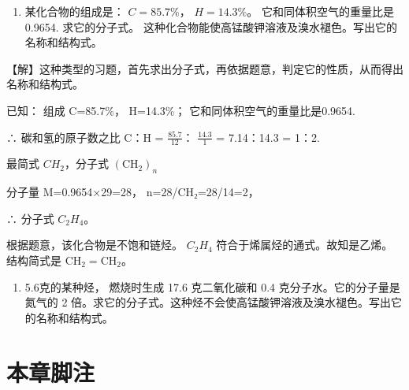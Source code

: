 \begin{enumerate}[start=9]
\item
  某化合物的组成是： \(C = 85.7\%\)， \(H = 14.3\%\)。
  它和同体积空气的重量比是 0.9654. 求它的分子式。
  这种化合物能使高锰酸钾溶液及溴水褪色。写出它的名称和结构式。
\end{enumerate}

【解】这种类型的习题，首先求出分子式，再依据题意，判定它的性质，从而得出名称和结构式。

已知： 组成 C=85.7\%， H=14.3\%； 它和同体积空气的重量比是0.9654.

∴ 碳和氢的原子数之比 C：H = \(\frac{85.7}{12}\)： \(\frac{14.3}{1}\) =
7.14：14.3 = 1：2.

最简式 \(CH_{2}\)，分子式 \((\mathrm{CH}_{2})_{n}\)

分子量 M=0.9654×29=28， n=28/CH₂=28/14=2，

∴ 分子式 \(C_{2}H_{4}\)。

根据题意，该化合物是不饱和链烃。 \(C_{2}H_{4}\)
符合于烯属烃的通式。故知是乙烯。结构简式是 \(\mathrm{CH_2=CH_2}\)。

\begin{enumerate}[start=10]
\item
  5.6克的某种烃， 燃烧时生成 17.6 克二氧化碳和 0.4
  克分子水。它的分子量是氮气的 2
  倍。求它的分子式。这种烃不会使高锰酸钾溶液及溴水褪色。写出它的名称和结构式。
\end{enumerate}

\section{本章脚注}

